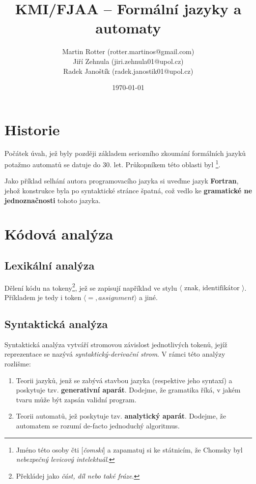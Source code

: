 \documentclass[10pt, a4paper, titlepage]{article}
\title{KMI/FJAA  -- Formální jazyky a automaty}
\author{\normalsize{Martin Rotter (rotter.martinos@gmail.com) \\
	Jiří Zehnula (jiri.zehnula01@upol.cz) \\
	Radek Janoštík (radek.janostik01@upol.cz)}}
\date{\today}
\theoremstyle{note}
\begin{document}
\maketitle

\section{Historie}
Počátek úvah, jež byly později základem seriozního zkoumání formálních jazyků potažmo automatů se datuje do 30. let.
Průkopníkem této oblasti byl 
\footnote{Jméno této osoby čti [\emph{čomski}] a zapamatuj si ke státnicím, že Chomsky byl \emph{nebezpečný levicový intelektuál}.}.

Jako příklad selhání autora programovacího jazyka si uveďme jazyk \textbf{Fortran}, jehož konstrukce byla po syntaktické stránce špatná,
což vedlo ke \textbf{gramatické ne jednoznačnosti} tohoto jazyka.

\section{Kódová analýza}
\subsection{Lexikální analýza}
Dělení kódu na tokeny\footnote{Překládej jako \emph{část, díl nebo také fráze}.}, jež se zapisují například ve stylu
$\langle\text{ znak, identifikátor }\rangle$.
Příkladem je tedy i token $\langle =, assignment \rangle$ a jiné.

\subsection{Syntaktická analýza}
Syntaktická analýza vytváří stromovou závislost jednotlivých tokenů, jejíž reprezentace se nazývá \emph{syntaktický-derivační strom}.
V rámci této analýzy rozlišme:
\begin{enumerate}
\item
Teorii jazyků, jenž se zabývá stavbou jazyka (respektive jeho syntaxí) a poskytuje tzv. \textbf{generativní aparát}.
Dodejme, že gramatika říká, v jakém tvaru může být zapsán validní program.

\item
Teorii automatů, jež poskytuje tzv. \textbf{analytický aparát}.
Dodejme, že automatem se rozumí de-facto jednoduchý algoritmus.
\end{enumerate}
\end{document}
